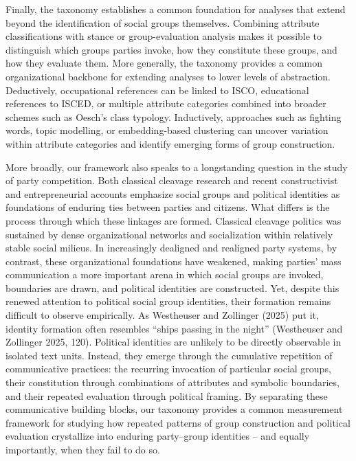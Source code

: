 \documentclass[12pt]{article}
\begin{document}
Finally, the taxonomy establishes a common foundation for analyses that extend beyond the identification of social groups themselves.
Combining attribute classifications with stance or group-evaluation analysis makes it possible to distinguish which groups parties invoke, how they constitute these groups, and how they evaluate them.
More generally, the taxonomy provides a common organizational backbone for extending analyses to lower levels of abstraction.
Deductively, occupational references can be linked to ISCO, educational references to ISCED, or multiple attribute categories combined into broader schemes such as Oesch's class typology.
Inductively, approaches such as fighting words, topic modelling, or embedding-based clustering can uncover variation within attribute categories and identify emerging forms of group construction.

More broadly, our framework also speaks to a longstanding question in the study of party competition.
Both classical cleavage research and recent constructivist and entrepreneurial accounts emphasize social groups and political identities as foundations of enduring ties between parties and citizens. 
What differs is the process through which these linkages are formed.
Classical cleavage politics was sustained by dense organizational networks and socialization within relatively stable social milieus. 
In increasingly dealigned and realigned party systems, by contrast, these organizational foundations have weakened, making parties' mass communication a more important arena in which social groups are invoked, boundaries are drawn, and political identities are constructed.
Yet, despite this renewed attention to political social group identities, their formation remains difficult to observe empirically.
As Westheuser and Zollinger (2025) put it, identity formation often resembles ``ships passing in the night'' (Westheuser and Zollinger 2025, 120).
Political identities are unlikely to be directly observable in isolated text units.
Instead, they emerge through the cumulative repetition of communicative practices: the recurring invocation of particular social groups, their constitution through combinations of attributes and symbolic boundaries, and their repeated evaluation through political framing.
By separating these communicative building blocks, our taxonomy provides a common measurement framework for studying how repeated patterns of group construction and political evaluation crystallize into enduring party--group identities -- and equally importantly, when they fail to do so.
\end{document}
